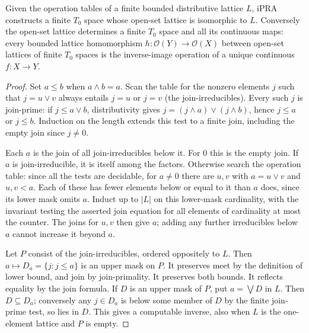 \begin{theorem}\label{idx-finite216}
Given the operation tables of a finite bounded distributive lattice $L$,
iPRA constructs a finite $T_0$ space whose open-set lattice is isomorphic
to $L$. Conversely the open-set lattice determines a finite $T_0$ space
and all its continuous maps: every bounded lattice homomorphism
$h:\mathcal O(Y)\to\mathcal O(X)$ between open-set lattices of finite
$T_0$ spaces is the inverse-image operation of a unique continuous
$f:X\to Y$.
\end{theorem}
\begin{proof}
Set $a\le b$ when $a\wedge b=a$. Scan the table for the nonzero elements
$j$ such that $j=u\vee v$ always entails $j=u$ or $j=v$ (the
join-irreducibles). Every such $j$ is join-prime: if $j\le a\vee b$,
distributivity gives $j=(j\wedge a)\vee(j\wedge b)$, hence $j\le a$ or
$j\le b$. Induction on the length extends this test to a finite join,
including the empty join since $j\ne0$.

Each $a$ is the join of all join-irreducibles below it. For $0$ this is the
empty join. If $a$ is join-irreducible, it is itself among the factors.
Otherwise search the operation table: since all the tests are decidable,
for $a\ne0$ there are $u,v$ with $a=u\vee v$ and $u,v<a$.
Each of these has fewer elements below or equal to it than $a$ does, since
its lower mask omits $a$. Induct up to $|L|$ on this lower-mask cardinality,
with the invariant testing the asserted join equation for all elements of
cardinality at most the counter. The joins for $u,v$ then give $a$; adding
any further irreducibles below $a$ cannot increase it beyond $a$.

Let $P$ consist of the join-irreducibles, ordered oppositely to $L$.
Then $a\mapsto D_a=\{j:j\le a\}$ is an upper mask on $P$. It preserves
meet by the definition of lower bound, and join by join-primality. It
preserves both bounds. It reflects equality by the join formula. If $D$ is
an upper mask of $P$, put $a=\bigvee D$ in $L$. Then $D\subseteq D_a$;
conversely any $j\in D_a$ is below some member of $D$ by the finite
join-prime test, so lies in $D$. This gives a computable inverse, also
when $L$ is the one-element lattice and $P$ is empty.


\end{proof}
